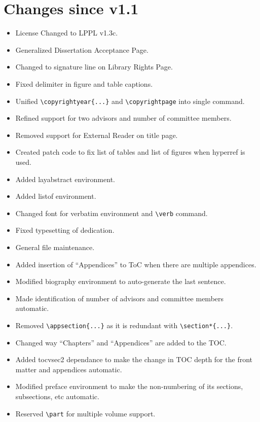 \section{Changes since v1.1}
\begin{itemize}
\item{License Changed to LPPL v1.3c.}
\item{Generalized Dissertation Acceptance Page.}
\item{Changed to signature line on Library Rights Page.}
\item{Fixed delimiter in figure and table captions.}
\item{Unified \verb=\copyrightyear{...}= and \verb=\copyrightpage= into single command.}
\item{Refined support for two advisors and number of committee members.}
\item{Removed support for External Reader on title page.}
\item{Created patch code to fix list of tables and list of figures when hyperref is used.}
\item{Added layabstract environment.}
\item{Added listof environment.}
\item{Changed font for verbatim environment and \verb=\verb= command.}
\item{Fixed typesetting of dedication.}
\item{General file maintenance.}
\item{Added insertion of ``Appendices'' to ToC when there are multiple appendices.}
\item{Modified biography environment to auto-generate the last sentence.}
\item{Made identification of number of advisors and committee members automatic.}
\item{Removed \verb=\appsection{...}= as it is redundant with \verb=\section*{...}=.}
\item{Changed way ``Chapters'' and ``Appendices'' are added to the TOC.}
\item{Added tocvsec2 dependance to make the change in TOC depth for the front matter and appendices automatic.}
\item{Modified preface environment to make the non-numbering of its sections, subsections, etc automatic.}
\item{Reserved \verb=\part= for multiple volume support.}

\end{itemize}
